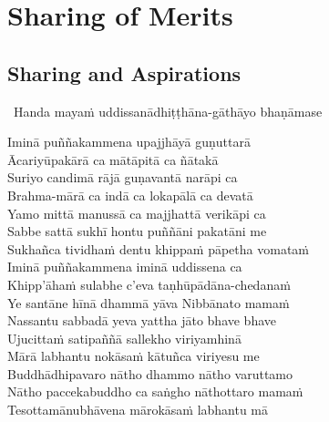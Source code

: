 \ifdesktopversion
{}
\else
{}
\fi

\chapter{Sharing of Merits}

\begingroup
\setsechook{%
  \clearpage%
  \setsecnumformat{}%
}

\setsecheadstyle{\sectionFmt}

\section{Sharing and Aspirations}
\label{uddissanadhitthana}

\begin{leader}
  \anglebracketleft\ \hspace{-0.5mm}Handa mayaṁ uddissanādhiṭṭhāna-gāthāyo bhaṇāmase \hspace{-0.5mm}\anglebracketright\
\end{leader}

Iminā puññakammena upajjhāyā guṇuttarā\\
Ācariyūpakārā ca mātāpitā ca ñātakā\\
Suriyo candimā rājā guṇavantā narāpi ca\\
Brahma-mārā ca indā ca lokapālā ca devatā\\
Yamo mittā manussā ca majjhattā verikāpi ca\\
Sabbe sattā sukhī hontu puññāni pakatāni me\\
Sukhañca tividhaṁ dentu khippaṁ pāpetha vomataṁ\\
Iminā puññakammena iminā uddissena ca\\
Khipp'āhaṁ sulabhe c'eva taṇhūpādāna-chedanaṁ\\
Ye santāne hīnā dhammā yāva Nibbānato mamaṁ\\
Nassantu sabbadā yeva yattha jāto bhave bhave\\
Ujucittaṁ satipaññā sallekho viriyamhinā\\
Mārā labhantu nokāsaṁ kātuñca viriyesu me\\
Buddhādhipavaro nātho dhammo nātho varuttamo\\
Nātho paccekabuddho ca saṅgho nāthottaro mamaṁ\\
Tesottamānubhāvena mārokāsaṁ labhantu mā

